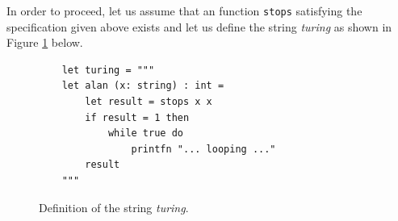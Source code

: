 In order to proceed, let us assume that an \Fsharp{} function \texttt{stops}
satisfying the specification given above exists and let us define the string
\textsl{turing} as shown in Figure \ref{fig:turing-string} below.

\begin{figure}[!h]
  \centering
\begin{verbatim}  
    let turing = """
    let alan (x: string) : int =
        let result = stops x x
        if result = 1 then
            while true do
                printfn "... looping ..."
        result
    """
\end{verbatim}
  \vspace*{-0.3cm}
  \caption{Definition of the string \textsl{turing}.}
  \label{fig:turing-string}
\end{figure}

